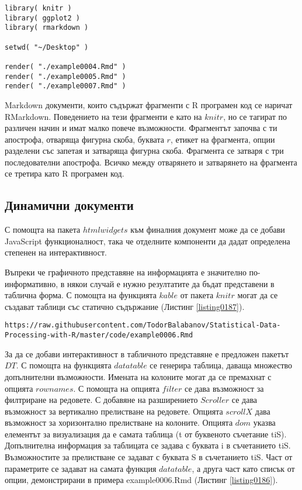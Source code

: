 \begin{lstlisting}[caption=Транслиране от RMarkdown в HTML и PDF, label=listing0185]
library( knitr )
library( ggplot2 )
library( rmarkdown )

setwd( "~/Desktop" )

render( "./example0004.Rmd" )
render( "./example0005.Rmd" )
render( "./example0007.Rmd" )
\end{lstlisting}

Markdown документи, които съдържат фрагменти с R програмен код се наричат RMarkdown. Поведението на тези фрагменти е като на $knitr$, но се тагират по различен начин и имат малко повече възможности. Фрагментът започва с ти апострофа, отваряща фигурна скоба, буквата $r$, етикет на фрагмента, опции разделени със запетая и затваряща фигурна скоба. Фрагмента се затваря с три последователни апострофа. Всичко между отварянето и затварянето на фрагмента се третира като R програмен код. 

\subsection{Динамични документи}

С помощта на пакета $htmlwidgets$ към финалния документ може да се добави JavaScript функционалност, така че отделните компоненти да дадат определена степенен на интерактивност. 

Въпреки че графичното представяне на информацията е значително по-информативно, в някои случай е нужно резултатите да бъдат представени в таблична форма. С помощта на функцията $kable$ от пакета $knitr$ могат да се създават таблици със статично съдържание (Листинг \ref{listing0187}).

\begin{lstlisting}[caption=Адрес на примерни интерактивни документ, label=listing0186]
https://raw.githubusercontent.com/TodorBalabanov/Statistical-Data-Processing-with-R/master/code/example0006.Rmd
\end{lstlisting}

За да се добави интерактивност в табличното представяне е предложен пакетът $DT$. С помощта на функцията $datatable$ се генерира таблица, даваща множество допълнителни възможности. Имената на колоните могат да се премахнат с опцията $rownames$. С помощта на опцията $filter$ се дава възможност за филтриране на редовете. С добавяне на разширението $Scroller$ се дава възможност за вертикално прелистване на редовете. Опцията $scrollX$ дава възможност за хоризонтално прелистване на колоните. Опцията $dom$ указва елементът за визуализация да е самата таблица (t от буквеното съчетание tiS). Допълнителна информация за таблицата се задава с буквата i в съчетанието tiS. Възможностите за прелистване се задават с буквата S в съчетанието tiS. Част от параметрите се задават на самата функция $datatable$, а друга част като списък от опции, демонстрирани в примера example0006.Rmd (Листинг \ref{listing0186}).

